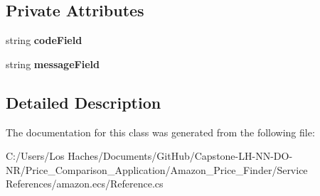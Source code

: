 \subsection*{Private Attributes}
\begin{DoxyCompactItemize}
\item 
\hypertarget{class_price___comparison_1_1amazon_1_1ecs_1_1_errors_error_a651a11b073995f881d7cfcb96065d091}{string {\bfseries code\-Field}}\label{class_price___comparison_1_1amazon_1_1ecs_1_1_errors_error_a651a11b073995f881d7cfcb96065d091}

\item 
\hypertarget{class_price___comparison_1_1amazon_1_1ecs_1_1_errors_error_a93815c840811685a4bb1f38dc6862af4}{string {\bfseries message\-Field}}\label{class_price___comparison_1_1amazon_1_1ecs_1_1_errors_error_a93815c840811685a4bb1f38dc6862af4}

\end{DoxyCompactItemize}


\subsection{Detailed Description}


The documentation for this class was generated from the following file\-:\begin{DoxyCompactItemize}
\item 
C\-:/\-Users/\-Los Haches/\-Documents/\-Git\-Hub/\-Capstone-\/\-L\-H-\/\-N\-N-\/\-D\-O-\/\-N\-R/\-Price\-\_\-\-Comparison\-\_\-\-Application/\-Amazon\-\_\-\-Price\-\_\-\-Finder/\-Service References/amazon.\-ecs/Reference.\-cs\end{DoxyCompactItemize}
